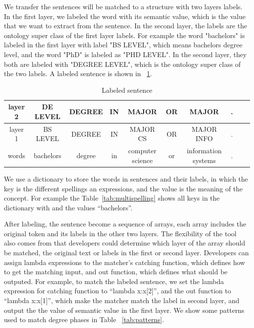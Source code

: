 We transfer the sentences will be matched to a structure with two layers labels. In the first layer, we labeled the word with its semantic value, which is the value that we want to extract from the sentence. In the second layer, the labels are the ontology super class of the first layer labels. For example the word "bachelors" is labeled in the first layer with label "BS LEVEL", which means bachelors degree level, and the word "PhD" is labeled as "PHD LEVEL". In the second layer, they both are labeled with "DEGREE LEVEL", which is the ontology super class of the two labels. A labeled sentence is shown in ~\ref{tab:labeldsent}.

\begin{table}[ht]
\caption{Labeled sentence } %
\centering %
\begin{tabular}{  | c | c | c | c | c |c | c |c | c | c |  }
 \hline
 layer 2 & DE LEVEL   & DEGREE & IN & MAJOR            & OR & MAJOR  &.  \\
 \hline
 layer 1 &  BS LEVEL   & DEGREE & IN & MAJOR CS         & OR & MAJOR INFO & .      \\
 \hline
   words & bachelors   & degree & in & computer science & or & information systems & .     \\
  \hline
\end{tabular}
\label{tab:labeldsent} %
\end{table}

We use a dictionary to store the words in sentences and their labels, in which the key is the different spellings an expressions, and the value is the meaning of the concept. For example the Table~\ref{tab:multispelling} shows all keys in the dictionary with and the values ``bachelors''.

After labeling, the sentence become a sequence of arrays, each array includes the original token and its labels in the other two layers. The flexibility of the tool also comes from that developers could determine which layer of the array should be matched, the original text or labels in the first or second layer.  Developers can assign lambda expressions to the matcher's catching function, which defines how to get the matching input,  and out function, which defines what should be outputed. For example, to match the labeled sentence, we set the lambda expression for catching function to ``lambda x:x[2]'', and the out function to ``lambda x:x[1]'', which make the matcher match the label in second layer, and output the the value of semantic value in the first layer. We show some patterns used to match degree phases in Table ~\ref{tab:patterns}.

